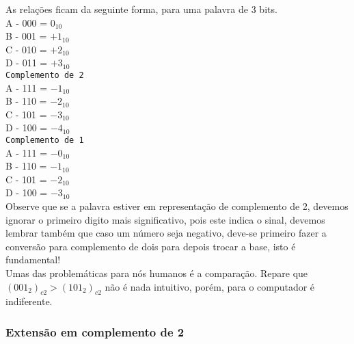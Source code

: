 \documentclass[12pt, onecolumn]{article}
\begin{document}
	\newline
	As relações ficam da seguinte forma, para uma palavra de 3 bits.\\
	\newline
	A - 000 = $0_{10}$\\
	B - 001 = $+1_{10}$\\
	C - 010 = $+2_{10}$\\
	D - 011 = $+3_{10}$\\
	\newline
	\texttt{Complemento de 2}\\
	\newline
	A - 111 = $-1_{10}$\\
	B - 110 = $-2_{10}$\\
	C - 101 = $-3_{10}$\\
	D - 100 = $-4_{10}$\\
	\newline
	\texttt{Complemento de 1}\\
	A - 111 = $-0_{10}$\\
	B - 110 = $-1_{10}$\\ 	
	C - 101 = $-2_{10}$\\ 	
	D - 100 = $-3_{10}$\\
	\newline
	Observe que se a palavra estiver em representação de 
	complemento de 2, devemos ignorar o primeiro digito
	mais significativo, pois este indica o sinal,
	devemos lembrar também que caso um número seja
	negativo, deve-se primeiro fazer a conversão 
	para complemento de dois para depois trocar a base, 
	isto é fundamental!\\
	\newline
	Umas das problemáticas para nós humanos é a comparação.
	Repare que $(001_2)_{c2} > (101_2)_{c2}$ não é nada
	intuitivo, porém, para o computador é indiferente.
	
	\subsubsection{\centering Extensão em complemento de 2}
	
\end{document}
